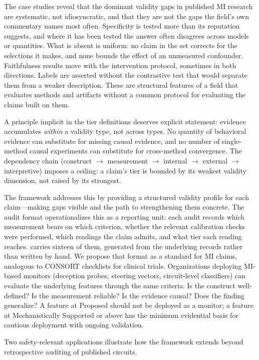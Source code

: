 \documentclass{article}
\begin{document}
The case studies reveal that the dominant validity gaps in published MI research are systematic, not idiosyncratic, and that they are not the gaps the field's own commentary names most often. Specificity is tested more than its reputation suggests, and where it has been tested the answer often disagrees across models or quantities. What is absent is uniform: no claim in the set corrects for the selections it makes, and none bounds the effect of an unmeasured confounder. Faithfulness results move with the intervention protocol, sometimes in both directions. Labels are asserted without the contrastive test that would separate them from a weaker description. These are structural features of a field that evaluates methods and artifacts without a common protocol for evaluating the claims built on them.

A principle implicit in the tier definitions deserves explicit statement: evidence accumulates \emph{within} a validity type, not across types.  No quantity of behavioral evidence can substitute for missing causal evidence, and no number of single-method causal experiments can substitute for cross-method convergence.  The dependency chain (construct $\to$ measurement $\to$ internal $\to$ external $\to$ interpretive) imposes a ceiling: a claim's tier is bounded by its weakest validity dimension, not raised by its strongest.

The framework addresses this by providing a structured validity profile for each claim---making gaps visible and the path to strengthening them concrete. The audit format operationalizes this as a reporting unit: each audit records which measurement bears on which criterion, whether the relevant calibration checks were performed, which readings the claim admits, and what tier each reading reaches.  carries sixteen of them, generated from the underlying records rather than written by hand. We propose that format as a standard for MI claims, analogous to CONSORT checklists for clinical trials. Organizations deploying MI-based monitors (deception probes, steering vectors, circuit-level classifiers) can evaluate the underlying features through the same criteria: Is the construct well-defined? Is the measurement reliable? Is the evidence causal? Does the finding generalize? A feature at Proposed should not be deployed as a monitor; a feature at Mechanistically Supported or above has the minimum evidential basis for cautious deployment with ongoing validation.

Two safety-relevant applications illustrate how the framework extends beyond retrospective auditing of published circuits.
\end{document}

